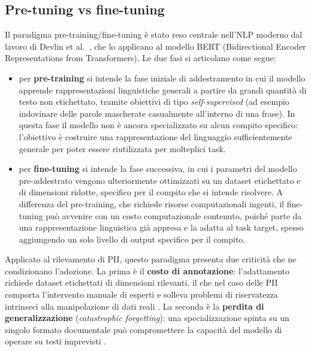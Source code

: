 \subsection{Pre-tuning vs fine-tuning}
\label{sub:pretuning-finetuning}
Il paradigma pre-training/fine-tuning è stato reso centrale nell'NLP moderno dal lavoro di Devlin et al.~\cite{devlinBERTPretrainingDeep2019}, che lo applicano al modello BERT (Bidirectional Encoder Representations from Transformers). Le due fasi si articolano come segue:

\begin{itemize}
	\item per \textbf{pre-training} si intende la fase iniziale di addestramento in cui il modello apprende rappresentazioni linguistiche generali a partire da grandi quantità di testo non etichettato, tramite obiettivi di tipo \textit{self-supervised} (ad esempio indovinare delle parole mascherate casualmente all'interno di una frase). In questa fase il modello non è ancora specializzato su alcun compito specifico: l'obiettivo è costruire una rappresentazione del linguaggio sufficientemente generale per poter essere riutilizzata per molteplici task.

	\item per \textbf{fine-tuning} si intende la fase successiva, in cui i parametri del modello pre-addestrato vengono ulteriormente ottimizzati su un dataset etichettato e di dimensioni ridotte, specifico per il compito che si intende risolvere. A differenza del pre-training, che richiede risorse computazionali ingenti, il fine-tuning può avvenire con un costo computazionale contenuto, poiché parte da una rappresentazione linguistica già appresa e la adatta al task target, spesso aggiungendo un solo livello di output specifico per il compito.
\end{itemize}

Applicato al rilevamento di PII, questo paradigma presenta due criticità che ne condizionano l'adozione. La prima è il \textbf{costo di annotazione}: l'adattamento richiede dataset etichettati di dimensioni rilevanti, il che nel caso delle PII comporta l'intervento manuale di esperti e solleva problemi di riservatezza intrinseci alla manipolazione di dati reali \cite{africanoPIIDetectionLowResource2024}. La seconda è la \textbf{perdita di generalizzazione} (\textit{catastrophic forgetting}): una specializzazione spinta su un singolo formato documentale può compromettere la capacità del modello di operare su testi imprevisti \cite{kirkpatrickOvercomingCatastrophicForgetting2017}. \medskip

